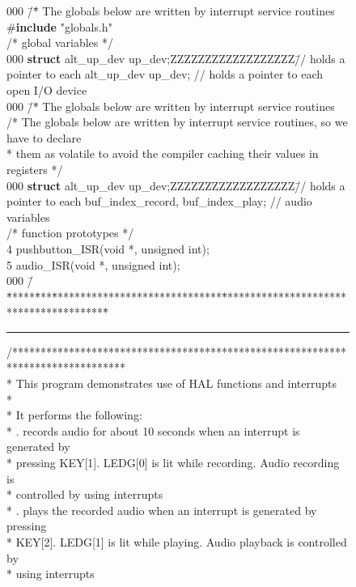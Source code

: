 \documentclass[11pt, twoside, pdftex]{article}
\begin{document}
\begin{figure}[h!]
\begin{center}
\begin{minipage}[t]{12.5 cm}
\begin{tabbing}
000 \=/\=* The globals below are written by interrupt service routines \>\#{\bf include} "globals.h"\\
\>/* global variables */\\
000 \={\bf struct} alt\_up\_dev up\_dev;ZZZZZZZZZZZZZZZZZZ\=// holds a pointer to each  alt\_up\_dev up\_dev;	\>// holds a pointer to each open I/O device\\
000 \=/\=* The globals below are written by interrupt service routines \kill
\>/* The globals below are written by interrupt service routines, so we have to declare \\
\>\>* them as volatile to avoid the compiler caching their values in registers */\\
000 \={\bf struct} alt\_up\_dev up\_dev;ZZZZZZZZZZZZZZZZZZ\=// holds a pointer to each  buf\_index\_record, buf\_index\_play;	\>// audio variables\\
\>/* function prototypes */\\
4 pushbutton\_ISR(void *, unsigned int);\\
5 audio\_ISR(void *, unsigned int);\\
000 \=/\=*****\=***\=******************************\=****************************************\=\kill
\rule{6.0in}{0in} 
\>/********************************************************************************\\
\>\>* This program demonstrates use of HAL functions and interrupts\\
\>\>*\\
\>\>* It performs the following: \\
\>\>*   . \>records audio for about 10 seconds when an interrupt is generated by\\
\>\>*   \>\> pressing KEY[1]. LEDG[0] is lit while recording. Audio recording is \\
\>\>*   \>\> controlled by using interrupts\\
\>\>*   . \>plays the recorded audio when an interrupt is generated by pressing\\
\>\>*   \>\> KEY[2]. LEDG[1] is lit while playing. Audio playback is controlled by \\
\>\>*   \>\> using interrupts\\

\end{tabbing}
\end{minipage}
\end{center}
\end{figure}
\end{document}
